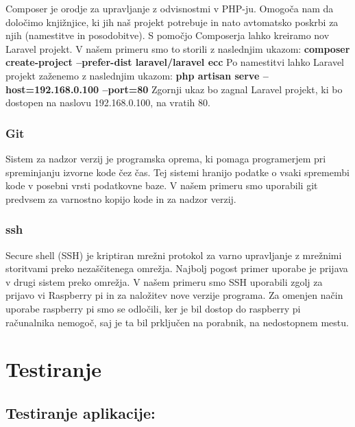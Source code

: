 \documentclass[12pt,a4paper,titlepage,openany]{report}
\begin{document}
Composer je orodje za upravljanje z odvisnostmi v PHP-ju. Omogoča nam da določimo knjižnjice, ki jih naš projekt potrebuje in nato avtomatsko poskrbi za njih (namestitve in posodobitve).
S pomočjo Composerja lahko kreiramo nov Laravel projekt. V našem primeru smo to storili z naslednjim ukazom:
\newline
\newline
\textbf{composer create-project --prefer-dist laravel/laravel ecc}
\newline
\newline
Po namestitvi lahko Laravel projekt zaženemo z naslednjim ukazom:
\newline
\newline
\textbf{php artisan serve --host=192.168.0.100 --port=80}
\newline
\newline
Zgornji ukaz bo zagnal Laravel projekt, ki bo dostopen na naslovu 192.168.0.100, na vratih 80. 

\subsection{Git}
Sistem za nadzor verzij je programska oprema, ki pomaga programerjem pri spreminjanju izvorne kode čez čas. Tej sistemi hranijo podatke o vsaki spremembi kode v posebni vrsti podatkovne baze. V našem primeru smo uporabili git predvsem za varnostno kopijo kode in za nadzor verzij.

\subsection{ssh}
Secure shell (SSH) je kriptiran mrežni protokol za varno upravljanje z mrežnimi storitvami preko nezaščitenega omrežja. Najbolj pogost primer uporabe je prijava v drugi sistem preko omrežja.
V našem primeru smo SSH uporabili zgolj za prijavo vi Raspberry pi in za naložitev nove verzije programa. Za omenjen način uporabe raspberry pi smo se odločili, ker je bil dostop do raspberry pi računalnika nemogoč, saj je ta bil prključen na porabnik, na nedostopnem mestu.

\chapter{Testiranje}
\thispagestyle{fancy}


\section{Testiranje aplikacije:}
\thispagestyle{fancy}
\end{document}
